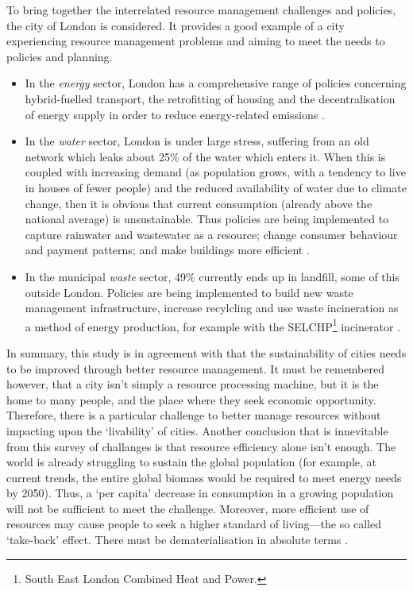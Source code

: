 To bring together the interrelated resource management challenges and policies, the city of London is considered. It provides a good example of a city experiencing resource management problems and aiming to meet the needs to policies and planning. 
\begin{itemize}
	\item In the \emph{energy} sector, London has a comprehensive range of policies concerning hybrid-fuelled transport, the retrofitting of housing and the decentralisation of energy supply in order to reduce energy-related emissions \citep{Strategy2011}. 
	\item In the \emph{water} sector, London is under large stress, suffering from an old network which leaks about 25\% of the water which enters it. When this is coupled with increasing demand (as population grows, with a tendency to live in houses of fewer people) and the reduced availability of water due to climate change, then it is obvious that current consumption (already above the national average) is unsustainable. Thus policies are being implemented to capture rainwater and wastewater as a resource; change consumer behaviour and payment patterns; and make buildings more efficient \citep{Nickson2011}. 
	\item In the municipal \emph{waste} sector, 49\% currently ends up in landfill, some of this outside London. Policies are being implemented to build new waste management infrastructure, increase recylcling and use waste incineration as a method of energy production, for example with the SELCHP\footnote{South East London Combined Heat and Power.} incinerator \citep{Zabala2011}.
\end{itemize}

In summary, this study is in agreement with \citet{Newman1999} that the sustainability of cities needs to be improved through better resource management. It must be remembered however, that a city isn't simply a resource processing machine, but it is the home to many people, and the place where they seek economic opportunity.  Therefore, there is a particular challenge to better manage resources without impacting upon the `livability' of cities. Another conclusion that is innevitable from this survey of challanges is that resource efficiency alone isn't enough. The world is already struggling to sustain the global population (for example, at current trends, the entire global biomass would be required to meet energy needs by 2050). Thus, a `per capita' decrease in consumption in a growing population will not be sufficient to meet the challenge. Moreover, more efficient use of resources may cause people to seek a higher standard of living---the so called `take-back' effect. There must be dematerialisation in absolute terms \citep{Winiwarter2011}.

